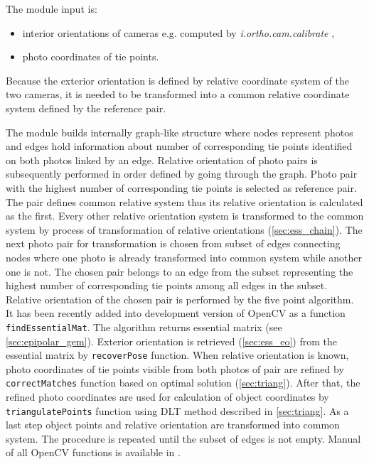 \documentclass[a4paper,12pt]{article}
\newcommand{\term}[1]{%
{\it #1}%
}
\begin{document}

The module input is: 
\begin{itemize}
\item interior orientations of cameras e.g. computed by \term{i.ortho.cam.calibrate},
\item photo coordinates of tie points.
\end{itemize}




Because the exterior orientation is defined by relative coordinate system of the two cameras, it is needed to be transformed into 
a common relative coordinate system defined by the reference pair.


The module builds internally graph-like structure where nodes represent photos and edges hold information 
about number of corresponding tie points identified on both photos linked by an edge.
Relative orientation of photo pairs is subsequently performed in order defined by going through the graph.
Photo pair with the highest number of corresponding tie points is selected as reference pair. 
The pair defines common relative system thus its relative orientation is calculated as the first. 
Every other relative orientation system is transformed to the common system 
by process of transformation of relative orientations (\ref{sec:ess_chain}).
The next photo pair for transformation is chosen from subset of edges connecting nodes where one photo is 
 already transformed into common system while another one is not. 
The chosen pair belongs to an edge from the subset representing 
 the highest number of corresponding tie points among all edges in the subset.
Relative orientation of the chosen pair is performed by  the five point algorithm. 
It has been recently added into development version of OpenCV as a function {\tt findEssentialMat}.
The algorithm returns essential matrix (see \ref{sec:epipolar_gem}). 
Exterior orientation is retrieved (\ref{sec:ess_eo}) from the essential matrix by {\tt recoverPose}  
function. When relative orientation is known, photo coordinates of tie points visible from both photos of pair are refined by 
{\tt correctMatches} function based on optimal solution (\ref{sec:triang}).
After that, the refined photo coordinates are used for calculation of object coordinates by {\tt triangulatePoints}
function using DLT method described in \ref{sec:triang}. 
As a last step object points and relative orientation are transformed into common
system. The procedure is repeated until the subset of edges is not empty. 
Manual of all OpenCV functions is available in \cite{calib_manual2013opencv}.
\end{document}
